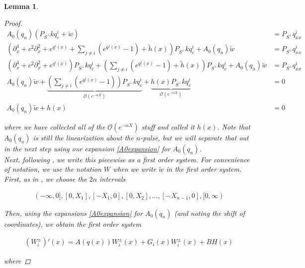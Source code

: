 \documentclass[12pt]{article}
\newtheorem{lemma}{Lemma}
\begin{document}
\begin{lemma}
\begin{proof}
\begin{align*}
A_0(q_n) (P_{S^\perp} k q^i_c + \tilde{w}) &= P_{S^\perp} q^i_{xx} \\
\left(\partial_x^4 + c^2 \partial_x^2 + e^{q^i(x)} + \sum_{j \neq i} (e^{q^j(x)} - 1) + \tilde{h}(x) \right)P_{S^\perp} k q^i_c + A_0(q_n) \tilde{w} &= P_{S^\perp} q^i_{xx} \\
(\partial_x^4 + c^2 \partial_x^2 + e^{q^i(x)})P_{S^\perp} k q^i_c + \left( \sum_{j \neq i} (e^{q^j(x)} - 1)+ \tilde{h}(x) \right) P_{S^\perp}k q^i_c + A_0(q_n) \tilde{w} &= P_{S^\perp} q^i_{xx} \\
A_0(q_n) \tilde{w} + \underbrace{\left( \sum_{j \neq i} (e^{q^j(x)} - 1)\right) P_{S^\perp} k q^i_c}_{\mathcal{O}(e^{-\alpha X})} 
+ \underbrace{h(x) P_{S^\perp}k q^i_c}_{\mathcal{O}(e^{-\alpha X})} &= 0 \\
A_0(q_n) \tilde{w} + h(x) &= 0
\end{align*}

where we have collected all of the $\mathcal{O}(e^{-\alpha X})$ stuff and called it $h(x)$. Note that $A_0(q_n)$ is still the linearization about the $n$-pulse, but we will separate that out in the next step using our expansion \eqref{A0expansion} for $A_0(q_n)$.\\

Next, following \cite{Sandstede1998}, we write this piecewise as a first order system. For convenience of notation, we use the notation $W$ when we write $\tilde{w}$ in the first order system. First, as in \cite{Sandstede1998}, we choose the $2n$ intervals 

\begin{align*}
(-\infty, 0], [0, X_1], [-X_1, 0], [0, X_2], \dots, [-X_{n-1}, 0], [0, \infty)
\end{align*}

Then, using the expansions \eqref{A0expansion} for $A_0(q_n)$ (and noting the shift of coordinates), we obtain the first order system

\begin{align*}
(W_i^\pm)'(x) = A(q(x)) W_i^\pm(x) + G_i(x) W_i^\pm(x) + B H(x)
\end{align*}

where


\end{proof}
\end{lemma}
\end{document}
